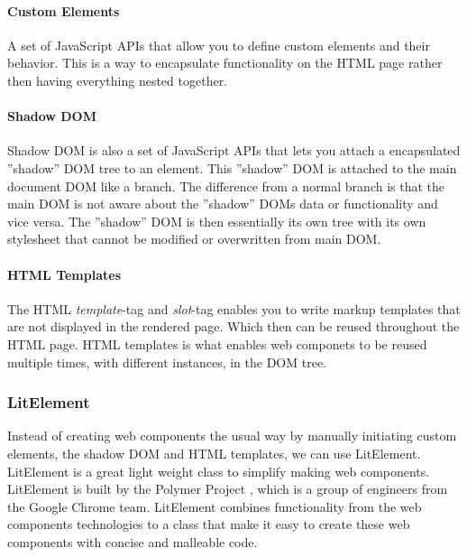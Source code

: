 \paragraph{Custom Elements}
A set of JavaScript APIs that allow you to define custom elements and their behavior. This is a way to encapsulate functionality on the HTML page rather then having everything nested together.

\paragraph{Shadow DOM}%
\label{ssub:Shadow DOM}
Shadow DOM is also a set of JavaScript APIs that lets you attach a encapsulated ''shadow'' DOM tree to an element. This ''shadow'' DOM is attached to the main document DOM like a branch. The difference from a normal branch is that the main DOM is not aware about the ''shadow'' DOMs data or functionality and vice versa. The ''shadow'' DOM is then essentially its own tree with its own stylesheet that cannot be modified or overwritten from main DOM.\\

\paragraph{HTML Templates}%
\label{ssub:HMTL Templates}
The HTML \textit{template}-tag and \textit{slot}-tag enables you to write markup templates that are not displayed in the rendered page. Which then can be reused throughout the HTML page. HTML templates is what enables web componets to be reused multiple times, with different instances, in the DOM tree.

\subsubsection{LitElement}%
\label{ssub:LitElement}
Instead of creating web components the usual way by manually initiating custom elements, the shadow DOM and HTML templates, we can use LitElement.
LitElement is a great light weight class to simplify making web components\cite{polymerLitElement}. LitElement is built by the Polymer Project \cite{polymerPolymerProject}, which is a group of engineers from the Google Chrome team. LitElement combines functionality from the web components technologies to a class that make it easy to create these web components with concise and malleable code.








